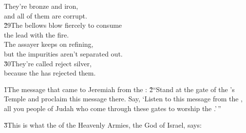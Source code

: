 \begin{poetry}
\poeml They're bronze and iron, \\
\poemll    and all of them are corrupt. \\
\poeml \v{29}The bellows blow fiercely to consume \\
\poemll    the lead with the fire. \\
\poeml The assayer keeps on refining, \\
\poemll    but the impurities aren't separated out. \\
\poeml \v{30}They're called reject silver, \\
\poemll    because the  has rejected them.
\end{poetry}

\v{1}The message that came to Jeremiah from the : \v{2}``Stand at the gate of the 's Temple and proclaim this message there. Say, `Listen to this message from the , all you people of Judah who come through these gates to worship the .'\,''

\v{3}This is what the  of the Heavenly Armies, the God of Israel, says:


